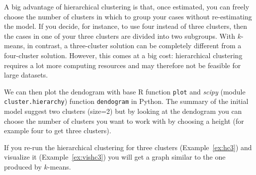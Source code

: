 A big advantage of hierarchical clustering is that, once estimated,
you can freely choose the number of clusters in which to group your
cases without re-estimating the model. If you decide, for instance, to
use four instead of three clusters, then the cases in one of
your three clusters are divided into two subgroups. With $k$-means, in
contrast, a three-cluster solution can be completely different from a
four-cluster solution. However, this comes at a big cost: hierarchical
clustering requires a lot more computing resources and may therefore
not be feasible for large datasets.


We can then plot the dendogram  with base R function \texttt{plot} and \emph{scipy} (module \texttt{cluster.hierarchy}) function \texttt{dendogram} in Python. The summary of the initial model suggest  two clusters (size=2) but by looking at the dendogram you can choose the number of clusters you want to work with by choosing a height (for example four to get three clusters).


If you re-run the hierarchical clustering for three clusters (Example~\ref{ex:hc3}) and visualize it (Example~\ref{ex:vishc3}) you will get a graph similar to the one produced by $k$-means.




